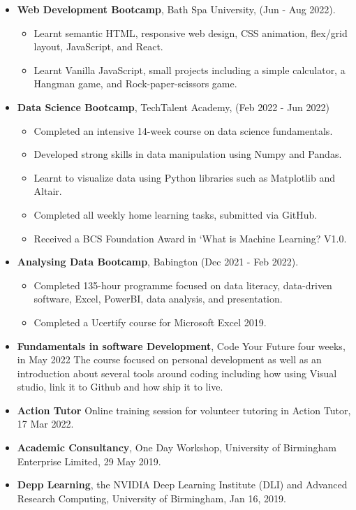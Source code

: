 \documentclass[line]{res}
\newenvironment{p1}
{\begin{adjustwidth}{-30pt}{0pt}
\vspace{8pt}}
{\end{adjustwidth}}
\begin{document}
\begin{resume}
\begin{p1}
\begin{itemize}
	\item \textbf{Web Development Bootcamp}, Bath Spa University, (Jun - Aug 2022).
	\begin{itemize}
		\item 	Learnt semantic HTML, responsive web design, CSS animation, flex/grid layout, JavaScript, and React.
		\item Learnt Vanilla JavaScript, small projects including a simple calculator, a Hangman game, and Rock-paper-scissors game.
	\end{itemize}
	
	\item \textbf{Data Science Bootcamp}, TechTalent Academy, (Feb 2022 - Jun 2022)
	\begin{itemize}
		\item Completed an intensive 14-week course on data science fundamentals.
		\item Developed strong skills in data manipulation using Numpy and Pandas.
		\item Learnt to visualize data using Python libraries such as Matplotlib and Altair.
		\item Completed all weekly home learning tasks, submitted via GitHub.
		\item Received a BCS Foundation Award in ‘What is Machine Learning? V1.0.
	\end{itemize}
	\item \textbf{Analysing Data Bootcamp}, Babington (Dec 2021 - Feb 2022).
	\begin{itemize}
		\item Completed 135-hour programme focused on data literacy, data-driven software, Excel, PowerBI, data analysis, and presentation.
		\item Completed a Ucertify course for Microsoft Excel 2019.
	\end{itemize}
	\item \textbf{Fundamentals in software Development}, Code Your Future four weeks, in May 2022
	The course focused on personal development as well as an introduction about several tools around coding including how using Visual studio, link it to Github and how ship it to live.  
	\item \textbf{Action Tutor} Online training session for volunteer tutoring in Action Tutor, 17 Mar 2022.
	\item \textbf{Academic Consultancy}, One Day Workshop, University of Birmingham Enterprise Limited, 29 May 2019.
	\item \textbf{Depp Learning}, the NVIDIA Deep Learning Institute (DLI) and Advanced Research Computing, University of Birmingham, Jan 16, 2019. 

\end{itemize}
\end{p1}
\end{resume}
\end{document}
